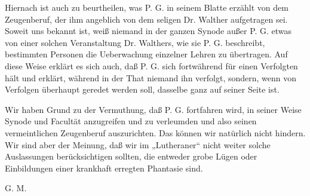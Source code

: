 Hiernach ist auch zu beurtheilen, was P. G. in seinem Blatte erzählt von dem Zeugenberuf, der ihm angeblich von dem seligen Dr. Walther aufgetragen sei. Soweit uns bekannt ist, weiß niemand in der ganzen Synode außer P. G. etwas von einer solchen Veranstaltung Dr. Walthers, wie sie P. G. beschreibt, bestimmten Personen die Ueberwachung einzelner Lehren zu übertragen. Auf diese Weise erklärt es sich auch, daß P. G. sich fortwährend für einen Verfolgten hält und erklärt, während in der That niemand ihn verfolgt, sondern, wenn von Verfolgen überhaupt geredet werden soll, dasselbe ganz auf seiner Seite ist.

Wir haben Grund zu der Vermuthung, daß P. G. fortfahren wird, in seiner Weise Synode und Facultät anzugreifen und zu verleumden und also seinen vermeintlichen Zeugenberuf auszurichten. Das können wir natürlich nicht hindern. Wir sind aber der Meinung, daß wir im „Lutheraner“ nicht weiter solche Auslassungen berücksichtigen sollten, die entweder grobe Lügen oder Einbildungen einer krankhaft erregten Phantasie sind.

G. M.
